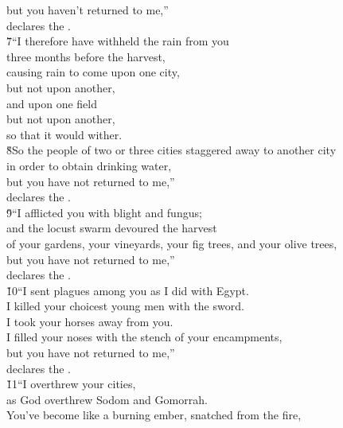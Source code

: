\begin{poetry}
\poeml but you haven't returned to me,'' \\
\poemll    declares the . \\
\poeml \v{7}``I therefore have withheld the rain from you \\
\poemll    three months before the harvest, \\
\poeml causing rain to come upon one city, \\
\poemll    but not upon another, \\
\poeml and upon one field \\
\poemll    but not upon another, \\
\poemlll       so that it would wither. \\
\poeml \v{8}So the people of two or three cities staggered away to another city \\
\poemll    in order to obtain drinking water, \\
\poeml but you have not returned to me,'' \\
\poemll    declares the . \\
\poeml \v{9}``I afflicted you with blight and fungus; \\
\poemll    and the locust swarm devoured the harvest \\
\poemlll       of your gardens, your vineyards, your fig trees, and your olive trees, \\
\poemll    but you have not returned to me,'' \\
\poemlll       declares the . \\
\poeml \v{10}``I sent plagues among you as I did with Egypt. \\
\poemll    I killed your choicest young men with the sword. \\
\poeml I took your horses away from you. \\
\poemll    I filled your noses with the stench of your encampments, \\
\poeml but you have not returned to me,'' \\
\poemll    declares the . \\
\poeml \v{11}``I overthrew your cities, \\
\poemll    as God overthrew Sodom and Gomorrah. \\
\poeml You've become like a burning ember, snatched from the fire, \\

\end{poetry}
